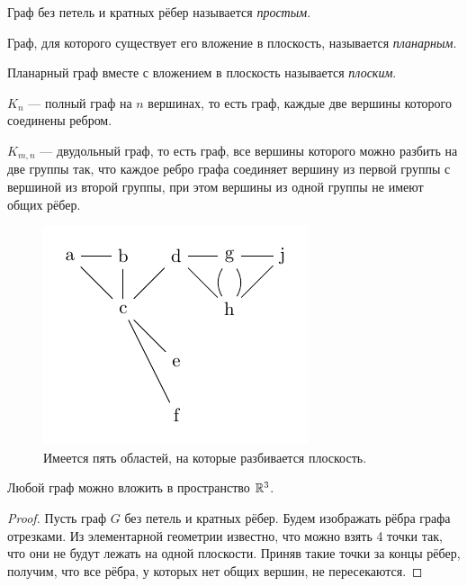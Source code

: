\begin{definition} %
    Граф без петель и кратных рёбер называется \textit{простым}.
\end{definition}

\begin{definition}
    Граф, для которого существует его вложение в плоскость, называется \textit{планарным}.
\end{definition}

\begin{definition}
    Планарный граф вместе с вложением в плоскость называется \textit{плоским}.
\end{definition}

\begin{definition} %
    $K_n$ — полный граф на $n$ вершинах, то есть граф, каждые две вершины которого соединены ребром.

    $K_{m,n}$ — двудольный граф, то есть граф, все вершины которого можно разбить на две группы так, что каждое ребро графа соединяет вершину из первой группы с вершиной из второй группы, при этом вершины из одной группы не имеют общих рёбер.
\end{definition}

\begin{figure}[h]
    \centering
    \includegraphics[scale=2]{images/c3.5.pdf}
    \caption{Имеется пять областей, на которые разбивается плоскость.}
    \label{fig:c3.5}
\end{figure}

\begin{statement}
    Любой граф можно вложить в пространство $\mathbb{R}^3$.
\end{statement} 
\begin{proof}
    Пусть граф $G$ без петель и кратных рёбер. Будем изображать рёбра графа отрезками. Из элементарной геометрии известно, что можно взять 4 точки так, что они не будут лежать на одной плоскости. Приняв такие точки за концы рёбер, получим, что все рёбра, у которых нет общих вершин, не пересекаются.
\end{proof} 


